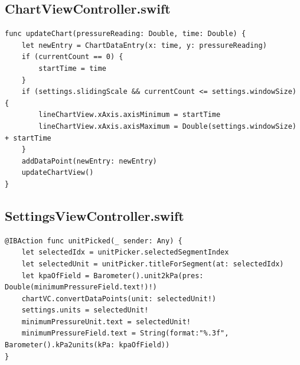 \documentclass[onecolumn, draftclsnofoot,10pt, compsoc]{IEEEtran}
\begin{document}
\subsection{ChartViewController.swift}
    \begin{lstlisting}
func updateChart(pressureReading: Double, time: Double) {
    let newEntry = ChartDataEntry(x: time, y: pressureReading)
    if (currentCount == 0) {
        startTime = time
    }
    if (settings.slidingScale && currentCount <= settings.windowSize) {
        lineChartView.xAxis.axisMinimum = startTime
        lineChartView.xAxis.axisMaximum = Double(settings.windowSize) + startTime
    }
    addDataPoint(newEntry: newEntry)
    updateChartView()
}
    \end{lstlisting}

\subsection{SettingsViewController.swift}
    \begin{lstlisting}
@IBAction func unitPicked(_ sender: Any) {
    let selectedIdx = unitPicker.selectedSegmentIndex
    let selectedUnit = unitPicker.titleForSegment(at: selectedIdx)
    let kpaOfField = Barometer().unit2kPa(pres: Double(minimumPressureField.text!)!)
    chartVC.convertDataPoints(unit: selectedUnit!)
    settings.units = selectedUnit!
    minimumPressureUnit.text = selectedUnit!
    minimumPressureField.text = String(format:"%.3f", Barometer().kPa2units(kPa: kpaOfField))
}
    \end{lstlisting}

\newpage


\end{document}
